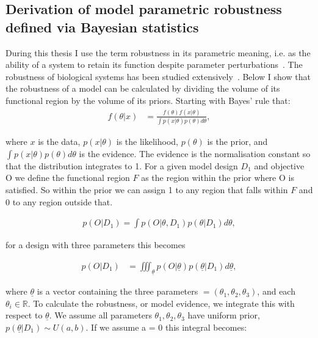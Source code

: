 	


\subsection{Derivation of model parametric robustness defined via Bayesian statistics}
\label{sec:rob_back}
During this thesis I use the term robustness in its parametric meaning, i.e. as the ability of a system to retain its function despite parameter perturbations~\autocite{Stelling:2004wo}. The robustness of biological systems has been studied extensively~\autocite{Barkai:1997cd, Stelling:2004wo, Prill:2005fq, Kim:2006uk, Kitano:2007cp, Hafner:2009ct, Shinar:2010dd, ZamoraSillero:2011jw, Woods:2016eh}. Below I show that the robustness of a model can be calculated by dividing the volume of its functional region by the volume of its priors. Starting with Bayes' rule that:
\begin{align}
	f(\theta|x) &= \frac{f(\theta)f(x|\theta)}{\int p(x|\theta)p(\theta)d\theta},
\end{align}

\noindent where $x$ is the data, $p(x|\theta)$ is the likelihood, $p(\theta)$ is the prior, and $\displaystyle \int p(x|\theta)p(\theta)d\theta$ is the evidence. The evidence is the normalisation constant so that the distribution integrates to 1. For a given model design $D_1$ and objective O we define the functional region $F$ as the region within the prior where O is satisfied. So within the prior we can assign 1 to any region that falls within $F$ and 0 to any region outside that. 

\begin{align}
p(O|D_1) = \int p(O|\theta,D_1)p(\theta|D_1)d\theta,
\end{align}

\noindent for a design with three parameters this becomes

\begin{align}
p(O|D_1) &= \displaystyle \iiint_{\underline{\theta}} p(O|\underline{\theta})p(\underline{\theta}|D_1)d\underline{\theta},
\end{align}

\noindent where $\underline{\theta}$ is a vector containing the three parameters $ = (\theta_1, \theta_2,\theta_3)$, and each $\theta_i \in \mathbb{R} $. To calculate the robustness, or model evidence, we integrate this with respect to $\underline{\theta}$. We assume  all parameters $\theta_1, \theta_2,\theta_3$ have uniform prior, $p(\underline{\theta}|D_1) \sim U(a, b)$. If we assume a = 0 this integral becomes:

